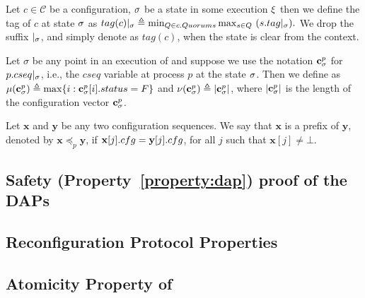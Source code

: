 	\begin{definition}  Let  $c \in \mathcal{C}$ be a configuration, $\sigma$ be a state in some execution $\EX$ then 
		we define the tag of $c$ at state $\sigma$ as  
		$ tag(c)|_{\sigma} \triangleq \min_{Q \in c.Quorums} \max_{s \in Q}~(s.tag|_{\sigma}).$
		We  drop the suffix $|_\sigma$, and simply denote as $tag(c)$,  when the state  is clear from the context.
	\end{definition}
	
	\begin{definition}
		Let $\sigma$ be any point in an execution of \ares{} and suppose we use the notation $\mathbf{c}^{p}_{\sigma}$ for $ p.cseq|_{\sigma}$,  i.e., the $cseq$ variable at process $p$ at the state $\sigma$. %
		Then we define as $ \mu(\mathbf{c}^{p}_{\sigma})  \triangleq  \max\{ i : \mathbf{c}^{p}_{\sigma}[i].status = F\}$ 
		and $ \nu(\mathbf{c}^{p}_{\sigma}) \triangleq |\mathbf{c}^{p}_{\sigma}|$, where $|\mathbf{c}^{p}_{\sigma}|$ is the length of the  configuration vector 
		$\mathbf{c}^{p}_{\sigma}$. %
	\end{definition}
	
	\begin{definition} 
		Let $\mathbf{x}$ and $\mathbf{y}$ be any two configuration sequences. We say that $\mathbf{x}$ is a prefix of $\mathbf{y}$, denoted by 
		$\mathbf{x} \preceq_p  \mathbf{y}$, if $\mathbf{x}[j].cfg=\mathbf{y}[j].cfg$, for all $j$ such that $\mathbf{x}[j]\neq\bot$.
	\end{definition}

\subsection{Safety (Property~\ref{property:dap})  proof of the DAP{s}}
\label{sec:safety:daps}


\subsection{Reconfiguration Protocol Properties}
\label{sec:safety:recon}


\subsection{Atomicity  Property of \ares{}}
\label{sec:safety:atomic}
